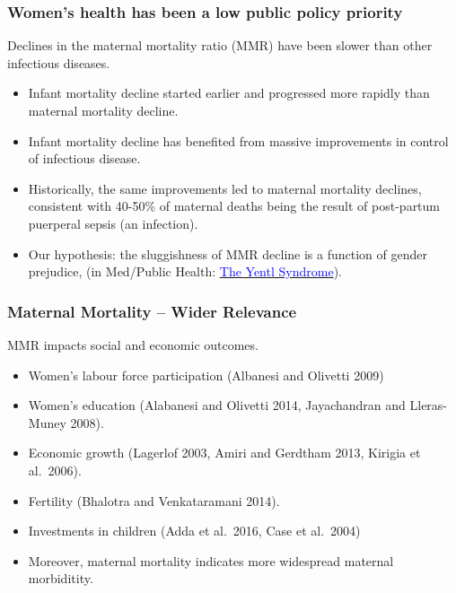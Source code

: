 \documentclass[9pt,letterpaper,subeqn]{beamer}
\begin{document}
\begin{frame}
\frametitle{Women's health has been a low public policy priority}
  Declines in the maternal mortality ratio (MMR) have been slower than other infectious diseases. \vspace{4mm}
\begin{itemize}
  \setlength{\itemsep}{10pt}
	\item Infant mortality decline started earlier and progressed more rapidly 
        than maternal mortality decline.
	\item Infant mortality decline has benefited from massive improvements in 
        control of infectious disease. 
	\item Historically, the same improvements led to maternal mortality declines, 
        consistent with 40-50\% of maternal deaths being the result of post-partum
        puerperal sepsis (an infection).
  \item Our hypothesis: the sluggishness of MMR decline is a function of gender 
        prejudice, (in Med/Public Health: \hyperlink{Yentl}{\textcolor{blue}
        {The Yentl Syndrome}}).
\end{itemize}
\end{frame}


\begin{frame}
\frametitle{Maternal Mortality -- Wider Relevance}
MMR impacts social and economic outcomes.  \vspace{4mm}
  \begin{itemize}
  \item Women's labour force participation (Albanesi and Olivetti 2009) 
  \item Women's education (Alabanesi and Olivetti 2014, Jayachandran and Lleras-Muney 2008).
  \item Economic growth (Lagerlof 2003, Amiri and Gerdtham 2013, Kirigia et al.\ 2006).
  \item Fertility (Bhalotra and Venkataramani 2014).
  \item Investments in children (Adda et al.\ 2016, Case et al.\ 2004)
  \item Moreover, maternal mortality indicates more widespread maternal morbiditity.
\end{itemize}
\end{frame}
\end{document}
